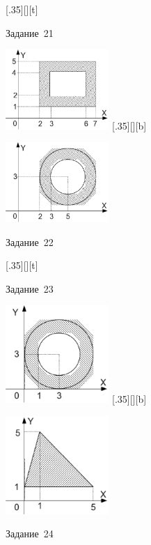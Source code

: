 \begin{figure}[H]
\begin{floatrow}
[.35\textwidth][\FBheight][t]
{\caption{Задание~21}
\label{ch03:refDrawing83}}
{\includegraphics[width=0.35\textwidth,keepaspectratio]{img/ris_3_84}}%
%
[.35\textwidth][\FBheight][b]
{\caption{Задание~22}
\label{ch03:refDrawing84}}
{\includegraphics[width=0.35\textwidth]{img/ris_3_85}}
\end{floatrow}
\end{figure}

\begin{figure}[H]
\begin{floatrow}
[.35\textwidth][\FBheight][t]
{\caption{Задание~23}
\label{ch03:refDrawing85}}
{\includegraphics[width=0.35\textwidth,keepaspectratio]{img/ris_3_86}}%
%
[.35\textwidth][\FBheight][b]
{\caption{Задание~24}
\label{ch03:refDrawing86}}
{\includegraphics[width=0.35\textwidth]{img/ris_3_87}}
\end{floatrow}
\end{figure}

